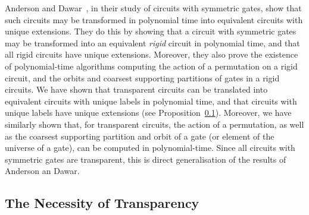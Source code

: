 \documentclass[../paper.tex]{subfiles}
\begin{document}
Anderson and Dawar~\cite{AndersonD17}, in their study of circuits with symmetric
gates, show that such circuits may be transformed in polynomial time into
equivalent circuits with unique extensions. They do this by showing that a
circuit with symmetric gates may be transformed into an equivalent \emph{rigid}
circuit in polynomial time, and that all rigid circuits have unique extensions.
Moreover, they also prove the existence of polynomial-time algorithms computing
the action of a permutation on a rigid circuit, and the orbits and coarsest
supporting partitions of gates in a rigid circuits. We have shown that
transparent circuits can be translated into equivalent circuits with unique
labels in polynomial time, and that circuits with unique labels have unique
extensions (see Proposition~\ref{}). Moreover, we have similarly shown that, for
transparent circuits, the action of a permutation, as well as the coarsest
supporting partition and orbit of a gate (or element of the universe of a gate),
can be computed in polynomial-time. Since all circuits with symmetric gates are
transparent, this is direct generalisation of the results of Anderson an Dawar.

\subsection{The Necessity of Transparency}

\end{document}
